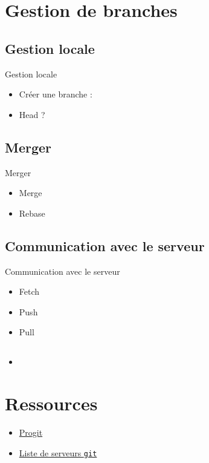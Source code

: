 \documentclass{beamer}
\newcommand{\git}{\texttt{git}}
\begin{document}

\section{Gestion de branches}
\subsection*{Gestion locale}
\begin{frame}{Gestion locale}
  \begin{itemize}
  \item Créer une branche :
  \item Head ?
  \end{itemize}
\end{frame}

\subsection*{Merger}
\begin{frame}{Merger}
  \begin{itemize}
  \item Merge
  \item Rebase
  \end{itemize}
\end{frame}

\subsection*{Communication avec le serveur}
\begin{frame}{Communication avec le serveur}
  \begin{itemize}
  \item Fetch
  \item Push
  \item Pull
  \end{itemize}
\end{frame}

\subsection*{}
\begin{frame}{}
  \begin{itemize}
  \item
  \end{itemize}
\end{frame}


\section{Ressources}
\begin{frame}{}
  \begin{itemize}
  \item \href{http://progit.org/about.html}{Progit}
  \item \href{http://git.or.cz/gitwiki/GitHosting}{Liste de serveurs \git}
  \end{itemize}
\end{frame}
\end{document}
